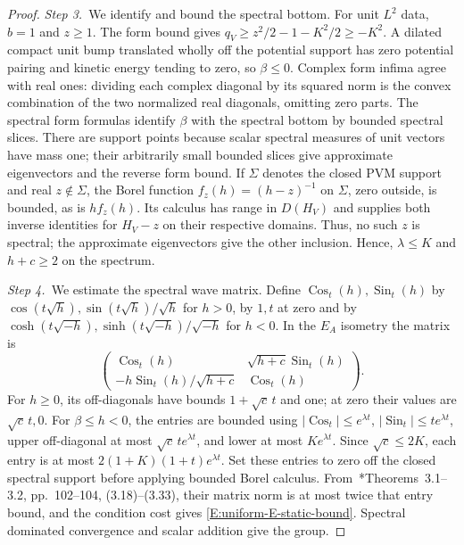 \begin{proof}
  \medskip
  \noindent\textit{Step 3.~}We identify and bound the spectral bottom.
  For unit $L^2$ data, $b = 1$ and $z \ge 1$. The form bound gives $q_V \ge
  z^2/2-1-K^2/2 \ge -K^2$. A dilated compact unit bump translated wholly off the
  potential support has zero potential pairing and kinetic energy tending to
  zero, so $\beta \le 0$. Complex form infima agree with real ones: dividing
  each complex diagonal by its squared norm is the convex combination of the two
  normalized real diagonals, omitting zero parts. The spectral form formulas
  identify $\beta$ with the spectral bottom by bounded spectral slices. There
  are support points because scalar spectral measures of unit vectors have mass
  one; their arbitrarily small bounded slices give approximate eigenvectors and
  the reverse form bound. If $\Sigma$ denotes the closed PVM support and real
  $z\notin\Sigma$, the Borel function $f_z(h) = (h-z)^{-1}$ on $\Sigma$, zero
  outside, is bounded, as is $hf_z(h)$. Its calculus has range in $D(H_V)$ and
  supplies both inverse identities for $H_V-z$ on their respective domains.
  Thus, no such $z$ is spectral; the approximate eigenvectors give the other
  inclusion. Hence, $\lambda \le K$ and $h+c \ge 2$ on the spectrum.


  \medskip
  \noindent\textit{Step 4.~}We estimate the spectral wave matrix.
  Define $\operatorname{Cos}_t(h),\operatorname{Sin}_t(h)$ by $\cos(t\sqrt
  h),\sin(t\sqrt h)/\sqrt h$ for $h > 0$, by $1,t$ at zero and by
  $\cosh(t\sqrt{-h}),\sinh(t\sqrt{-h})/\sqrt{-h}$ for $h < 0$. In the $E_A$
  isometry the matrix is
  \[
    \begin{pmatrix}
      \operatorname{Cos}_t(h)&\sqrt{h+c}\operatorname{Sin}_t(h)\\
      -h\operatorname{Sin}_t(h)/\sqrt{h+c}&\operatorname{Cos}_t(h)
    \end{pmatrix}.
  \]
  For $h \ge 0$, its off-diagonals have bounds $1+\sqrt c\,t$ and one; at zero
  their values are $\sqrt c\,t,0$. For $\beta \le h < 0$, the entries are
  bounded using $|\operatorname{Cos}_t| \le e^{\lambda t}$,
  $|\operatorname{Sin}_t| \le te^{\lambda t}$, upper off-diagonal at most $\sqrt
  c\,te^{\lambda t}$, and lower at most $Ke^{\lambda t}$. Since $\sqrt c \le
  2K$, each entry is at most $2(1+K)(1+t)e^{\lambda t}$. Set these entries to
  zero off the closed spectral support before applying bounded Borel calculus.
  From~\cite{teschl:14:mathematical}*{Theorems~3.1--3.2, pp.~102--104,
  (3.18)--(3.33)}, their matrix norm is at most twice that entry bound, and the
  condition cost gives \eqref{E:uniform-E-static-bound}. Spectral dominated
  convergence and scalar addition give the group.



\end{proof}
